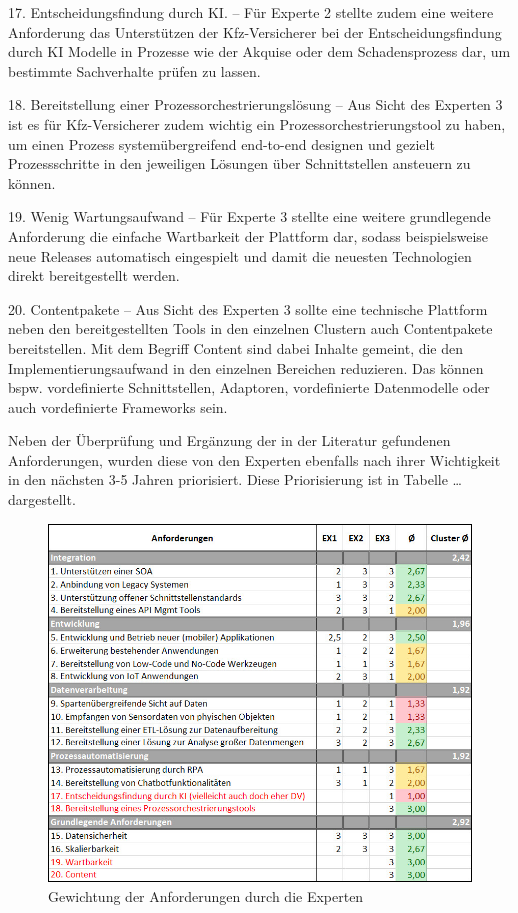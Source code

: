 17. Entscheidungsfindung durch KI. – Für Experte 2 stellte zudem eine weitere Anforderung das Unterstützen der Kfz-Versicherer bei der Entscheidungsfindung durch KI Modelle in Prozesse wie der Akquise oder dem Schadensprozess dar, um bestimmte Sachverhalte prüfen zu lassen.

18. Bereitstellung einer Prozessorchestrierungslösung – Aus Sicht des Experten 3 ist es für Kfz-Versicherer zudem wichtig ein Prozessorchestrierungstool zu haben, um einen Prozess systemübergreifend end-to-end designen und gezielt Prozessschritte in den jeweiligen Lösungen über Schnittstellen ansteuern zu können.

19. Wenig Wartungsaufwand – Für Experte 3 stellte eine weitere grundlegende Anforderung die einfache Wartbarkeit der Plattform dar, sodass beispielsweise neue Releases automatisch eingespielt und damit die neuesten Technologien direkt bereitgestellt werden.

20. Contentpakete – Aus Sicht des Experten 3 sollte eine technische Plattform neben den bereitgestellten Tools in den einzelnen Clustern auch Contentpakete bereitstellen. Mit dem Begriff Content sind dabei Inhalte gemeint, die den Implementierungsaufwand in den einzelnen Bereichen reduzieren. Das können bspw. vordefinierte Schnittstellen, Adaptoren, vordefinierte Datenmodelle oder auch vordefinierte Frameworks sein. 

Neben der Überprüfung und Ergänzung der in der Literatur gefundenen Anforderungen, wurden diese von den Experten ebenfalls nach ihrer Wichtigkeit in den nächsten 3-5 Jahren priorisiert. Diese Priorisierung ist in Tabelle  … dargestellt.

\begin{figure}[h]
    \centering
    \includegraphics[width=1\textwidth]{img/Gewichtung_Anforderung.jpg}
    \caption[Gewichtung der Anforderungen durch die Experten]{Gewichtung der Anforderungen durch die Experten\autocite{Gewichtung}}
    \label{fig:Gewichtung}
\end{figure}

